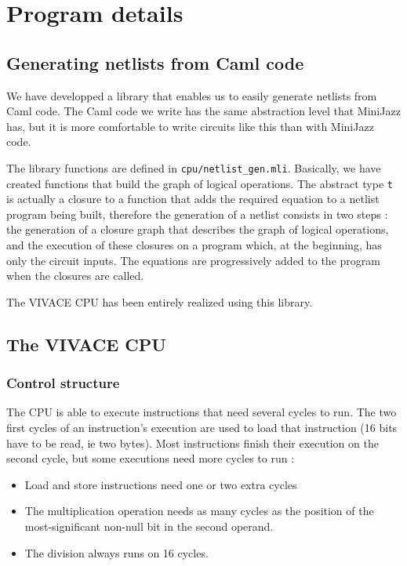 \documentclass[11pt, a4paper]{article}
\newcommand{\prog}[1]{{\tt#1}}
\begin{document}
\section{Program details}
\subsection{Generating netlists from Caml code}

We have developped a library that enables us to easily generate netlists from Caml code. The Caml code we write
has the same abstraction level that MiniJazz has, but it is more comfortable to write circuits like this than
with MiniJazz code.

The library functions are defined in \prog{cpu/netlist\_gen.mli}. Basically, we have created functions that build
the graph of logical operations. The abstract type \prog{t} is actually a closure to a function that adds the
required equation to a netlist program being built, therefore the generation of a netlist consists in two steps :
the generation of a closure graph that describes the graph of logical operations, and the execution of these
closures on a program which, at the beginning, has only the circuit inputs. The equations are progressively
added to the program when the closures are called.

The VIVACE CPU has been entirely realized using this library.

\subsection{The VIVACE CPU}

\subsubsection{Control structure}

The CPU is able to execute instructions that need several cycles to run. The two first cycles of an instruction's
execution are used to load that instruction (16 bits have to be read, ie two bytes). Most instructions finish
their execution on the second cycle, but some executions need more cycles to run :

\begin{itemize}
    \item Load and store instructions need one or two extra cycles
    \item The multiplication operation needs as many cycles as the position
        of the most-significant non-null bit in the second operand.
    \item The division always runs on 16 cycles.
\end{itemize}
\end{document}
